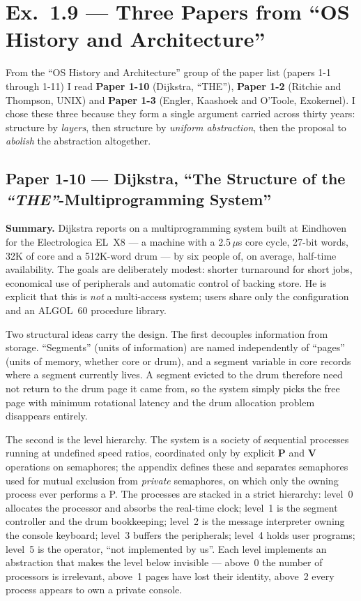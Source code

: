 \section*{Ex.\ 1.9 --- Three Papers from ``OS History and Architecture''}
\label{p3:sec:ex19}

From the ``OS History and Architecture'' group of the paper list (papers 1-1 through 1-11)
I read \textbf{Paper 1-10} (Dijkstra, ``THE''), \textbf{Paper 1-2} (Ritchie and Thompson,
UNIX) and \textbf{Paper 1-3} (Engler, Kaashoek and O'Toole, Exokernel). I chose these three
because they form a single argument carried across thirty years: structure by
\emph{layers}, then structure by \emph{uniform abstraction}, then the proposal to
\emph{abolish} the abstraction altogether.

\subsection*{Paper 1-10 --- Dijkstra, ``The Structure of the \textit{``THE''}-Multiprogramming System''}
\label{p3:sec:the}

\textbf{Summary.}
Dijkstra reports on a multiprogramming system built at Eindhoven for the Electrologica
EL~X8 --- a machine with a 2.5\,$\mu$s core cycle, 27-bit words, 32K of core and a
512K-word drum --- by six people of, on average, half-time availability. The goals are
deliberately modest: shorter turnaround for short jobs, economical use of peripherals and
automatic control of backing store. He is explicit that this is \emph{not} a multi-access
system; users share only the configuration and an ALGOL~60 procedure library.

Two structural ideas carry the design. The first decouples information from storage.
``Segments'' (units of information) are named independently of ``pages'' (units of memory,
whether core or drum), and a segment variable in core records where a segment currently
lives. A segment evicted to the drum therefore need not return to the drum page it came
from, so the system simply picks the free page with minimum rotational latency and the drum
allocation problem disappears entirely.

The second is the level hierarchy. The system is a society of sequential processes running
at undefined speed ratios, coordinated only by explicit \textbf{P} and \textbf{V} operations
on semaphores; the appendix defines these and separates semaphores used for mutual exclusion
from \emph{private} semaphores, on which only the owning process ever performs a P. The
processes are stacked in a strict hierarchy: level~0 allocates the processor and absorbs the
real-time clock; level~1 is the segment controller and the drum bookkeeping; level~2 is the
message interpreter owning the console keyboard; level~3 buffers the peripherals; level~4
holds user programs; level~5 is the operator, ``not implemented by us''. Each level
implements an abstraction that makes the level below invisible --- above~0 the number of
processors is irrelevant, above~1 pages have lost their identity, above~2 every process
appears to own a private console.

